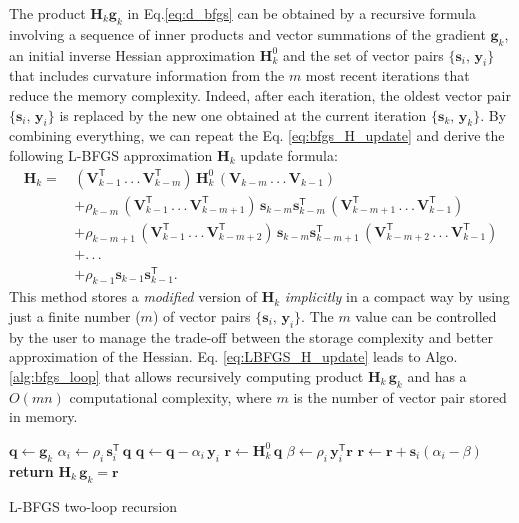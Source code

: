 \documentclass[11pt]{article}
\begin{document}
The product $\mathbf{H}_k\mathbf{g}_k$ in Eq.\ref{eq:d_bfgs} can be obtained by a recursive formula involving a sequence of inner products and vector summations of the gradient $\mathbf{g}_k$, an initial inverse Hessian approximation $\mathbf{H}^0_k$ and the set of vector pairs $\{ \mathbf{s}_i, \, \mathbf{y}_i\}$ that includes curvature information from the $m$ most recent iterations that reduce the memory complexity. Indeed, after each iteration, the oldest vector pair $\{ \mathbf{s}_i, \, \mathbf{y}_i\}$ is replaced by the new one obtained at the current iteration $\{ \mathbf{s}_k, \, \mathbf{y}_k\}$. By combining everything, we can repeat the Eq. \ref{eq:bfgs_H_update} and derive the following L-BFGS approximation $\mathbf{H}_k$ update formula:
\begin{equation}
\begin{split}
     \mathbf{H}_k = \,&(\mathbf{V}_{k-1}^\mathsf{T}\, .\,.\,.\, \mathbf{V}_{k-m}^\mathsf{T})\,\mathbf{H}_k^0\,(\mathbf{V}_{k-m}\,.\,.\,.\, \mathbf{V}_{k-1})\\
    & + \rho_{k-m}\,(\mathbf{V}_{k-1}^\mathsf{T}\,.\,.\,.\,\mathbf{V}_{k-m+1}^\mathsf{T})\, \mathbf{s}_{k-m}\mathbf{s}_{k-m}^\mathsf{T} \, (\mathbf{V}_{k-m+1}^\mathsf{T}\,.\,.\,.\,\mathbf{V}_{k-1}^\mathsf{T})\\
    & + \rho_{k-m+1}\,(\mathbf{V}_{k-1}^\mathsf{T}\,.\,.\,.\,\mathbf{V}_{k-m+2}^\mathsf{T})\,\mathbf{s}_{k-m}\mathbf{s}_{k-m+1}^\mathsf{T} \,(\mathbf{V}_{k-m+2}^\mathsf{T}\,.\,.\,.\,\mathbf{V}_{k-1}^\mathsf{T})\\
    & + .\,.\,.\\
    & + \rho_{k-1}\mathbf{s}_{k-1}\mathbf{s}_{k-1}^\mathsf{T}.
\end{split}
\label{eq:LBFGS_H_update}
\end{equation}
This method stores a \emph{modified} version of $\mathbf{H}_k$ \emph{implicitly} in a compact way by using just a finite number ($m$) of vector pairs $\{ \mathbf{s}_i, \, \mathbf{y}_i\}$. The $m$ value can be controlled by the user to manage the trade-off between the storage complexity and better approximation of the Hessian.
Eq. \ref{eq:LBFGS_H_update} leads to Algo. \ref{alg:bfgs_loop} that allows recursively computing product $\mathbf{H}_k \, \mathbf{g}_k$ and has a $O(mn)$ computational complexity, where $m$ is the number of vector pair stored in memory.

\begin{algorithm}
\SetAlgoLined
 $\mathbf{q} \leftarrow \mathbf{g}_k$ \;
    {$\alpha_i \leftarrow \rho_i \, \mathbf{s}_i^\mathsf{T} \, \mathbf{q}$\;
    $\mathbf{q} \leftarrow \mathbf{q} - \alpha_i \, \mathbf{y}_i$\;} 
 $\mathbf{r} \leftarrow \mathbf{H}_k^0 \, \mathbf{q}$\;
    {$\beta \leftarrow \rho_i \, \mathbf{y}_i^\mathsf{T} \mathbf{r} $\;
    $\mathbf{r} \leftarrow \mathbf{r} + \mathbf{s}_i(\alpha_i - \beta)$\;} 
 \textbf{return} $\mathbf{H}_k \, \mathbf{g}_k = \mathbf{r}$
 \caption{L-BFGS two-loop recursion}
\label{alg:bfgs_loop}
\end{algorithm}
\end{document}
